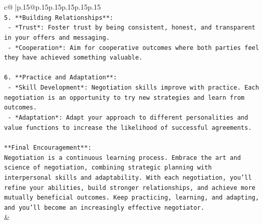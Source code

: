 \documentclass{article}
\begin{document}
{\begin{supertabular}{c@{$\;$}|p{.15\linewidth}@{}p{.15\linewidth}p{.15\linewidth}p{.15\linewidth}p{.15\linewidth}p{.15\linewidth}}
{{{\\ 
\texttt{5. **Building Relationships**:} \\
\texttt{   {-} *Trust*: Foster trust by being consistent, honest, and transparent in your offers and messaging.} \\
\texttt{   {-} *Cooperation*: Aim for cooperative outcomes where both parties feel they have achieved something valuable.} \\
\\ 
\texttt{6. **Practice and Adaptation**:} \\
\texttt{   {-} *Skill Development*: Negotiation skills improve with practice. Each negotiation is an opportunity to try new strategies and learn from outcomes.} \\
\texttt{   {-} *Adaptation*: Adapt your approach to different personalities and value functions to increase the likelihood of successful agreements.} \\
\\ 
\texttt{**Final Encouragement**:} \\
\texttt{Negotiation is a continuous learning process. Embrace the art and science of negotiation, combining strategic planning with interpersonal skills and adaptability. With each negotiation, you'll refine your abilities, build stronger relationships, and achieve more mutually beneficial outcomes. Keep practicing, learning, and adapting, and you'll become an increasingly effective negotiator.} \\
            }
        }
    }
    & \\ \\


\end{supertabular}}
\end{document}
